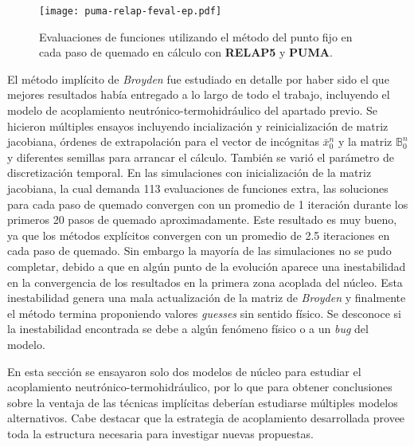 \begin{figure}[h!]
  \centering
  \texttt{[image: puma-relap-feval-ep.pdf]}  
  \caption[Evaluaciones de funciones utilizando el método del punto fijo en cada paso de quemado en cálculo con \textbf{RELAP5} y \textbf{Fermi}]
  {Evaluaciones de funciones utilizando el método del punto fijo en cada paso de quemado en cálculo con \textbf{RELAP5} y \textbf{PUMA}.}
  \label{fig-relap-puma-ep}
\end{figure}

El método implícito de \textit{Broyden} fue estudiado en detalle por haber sido el que mejores resultados había entregado a lo largo de todo el trabajo,
incluyendo el modelo de acoplamiento neutrónico-termohidráulico del apartado previo.
Se hicieron múltiples ensayos incluyendo incialización y reinicialización de matriz jacobiana,
órdenes de extrapolación para el vector de incógnitas $\bar{x}_0^n$ y la matriz $\mathbb{B}_{0}^n$ y
diferentes semillas para arrancar el cálculo.
También se varió el parámetro de discretización temporal.
En las simulaciones con inicialización de la matriz jacobiana, la cual demanda 113 evaluaciones de funciones extra,
las soluciones para cada paso de quemado convergen con un promedio de 1 iteración durante los primeros 20 pasos de quemado aproximadamente.
Este resultado es muy bueno, ya que los métodos explícitos convergen con un promedio de 2.5 iteraciones en cada paso de quemado.
Sin embargo la mayoría de las simulaciones no se pudo completar,
debido a que en algún punto de la evolución aparece una inestabilidad en la convergencia de los resultados en la primera zona acoplada del núcleo.
Esta inestabilidad genera una mala actualización de la matriz de \textit{Broyden} y finalmente el método termina proponiendo valores \textit{guesses} sin sentido físico.
Se desconoce si la inestabilidad encontrada se debe a algún fenómeno físico o a un \textit{bug} del modelo.

En esta sección se ensayaron solo dos modelos de núcleo para estudiar el acoplamiento neutrónico-termohidráulico,
por lo que para obtener conclusiones sobre la ventaja de las técnicas implícitas deberían estudiarse múltiples modelos alternativos.
Cabe destacar que la estrategia de acoplamiento desarrollada provee toda la estructura necesaria para investigar nuevas propuestas.
